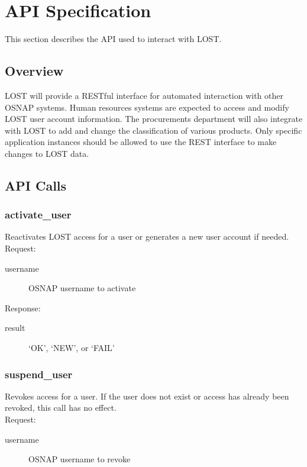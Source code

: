 \chapter*{API Specification}
This section describes the API used to interact with LOST.

\section*{Overview}
LOST will provide a RESTful interface for automated interaction with other OSNAP systems. Human resources systems are expected to access and modify LOST user account information. The procurements department will also integrate with LOST to add and change the classification of various products. Only specific application instances should be allowed to use the REST interface to make changes to LOST data.


\section*{API Calls}
\subsection*{activate\_user}
Reactivates LOST access for a user or generates a new user account if needed.
\\

\noindent Request:
\begin{description}
\item[username] OSNAP username to activate
\end{description}

\noindent Response:
\begin{description}
\item[result] `OK', `NEW', or `FAIL'
\end{description}


\subsection*{suspend\_user}
Revokes access for a user. If the user does not exist or access has already been revoked, this call has no effect.
\\

\noindent Request:
\begin{description}
\item[username] OSNAP username to revoke
\end{description}

